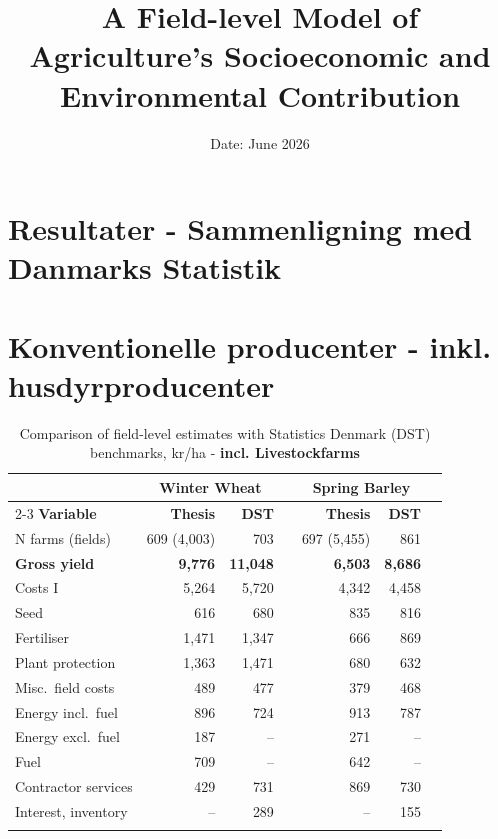 \documentclass[12pt]{article}
\author{}
\title{A Field-level Model of Agriculture's Socioeconomic and Environmental Contribution}
\subtitle{}
\date{Date: {June 2026}}
\begin{document}
\section*{Resultater - Sammenligning med Danmarks Statistik}

\section{Konventionelle producenter - inkl. husdyrproducenter}


\begin{table}[htbp]
\centering
\small
\caption{Comparison of field-level estimates with Statistics Denmark (DST) benchmarks, kr/ha - \textbf{incl. Livestockfarms}}
\label{tab:dst-comparison}
\begin{threeparttable}
\begin{tabular}{lrrrrrr}
\toprule
 & \multicolumn{2}{c}{\textbf{Winter Wheat}} & &
   \multicolumn{2}{c}{\textbf{Spring Barley}} \\
\cmidrule{2-3}\cmidrule{5-6}
\textbf{Variable} & \textbf{Thesis} & \textbf{DST} & &
                    \textbf{Thesis} & \textbf{DST} \\
\midrule\addlinespace
N farms (fields)                  &  609 (4,003) &   703 & & 697 (5,455) &   861 \\
\addlinespace

\textbf{Gross yield}              
& \textbf{9,776} & \textbf{11,048} & &
  \textbf{6,503} & \textbf{8,686} \\
\addlinespace

Costs I                           &       5,264 &  5,720 & &       4,342 &  4,458 \\
\quad Seed                        &         616 &    680 & &         835 &    816 \\
\quad Fertiliser                  &       1,471 &  1,347 & &         666 &    869 \\
\quad Plant protection            &       1,363 &  1,471 & &         680 &    632 \\
\quad Misc.\ field costs          &         489 &    477 & &         379 &    468 \\
\quad Energy incl.\ fuel          &         896 &    724 & &         913 &    787 \\
\quad \quad Energy excl.\ fuel    &         187 &     -- & &         271 &     -- \\
\quad \quad Fuel                  &         709 &     -- & &         642 &     -- \\
\quad Contractor services         &         429 &    731 & &         869 &    730 \\
\quad Interest, inventory         &          -- &    289 & &          -- &    155 \\
\addlinespace


\end{tabular}
\end{threeparttable}
\end{table}
\end{document}
